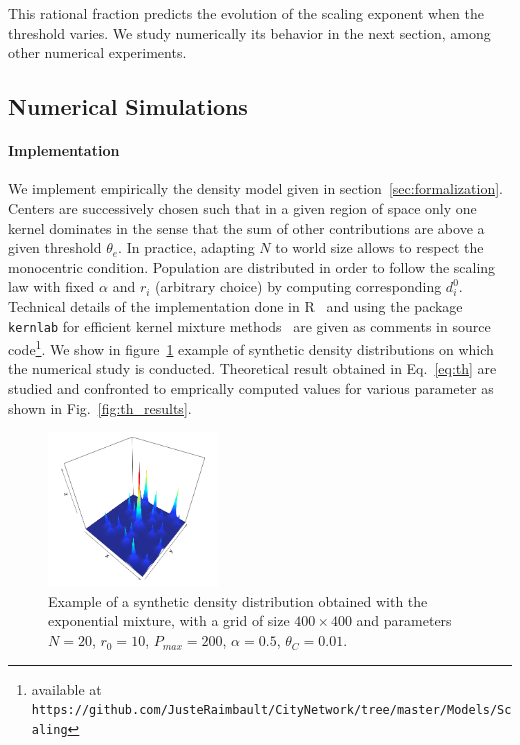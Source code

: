 This rational fraction predicts the evolution of the scaling exponent when the threshold varies. We study numerically its behavior in the next section, among other numerical experiments.


\subsection{Numerical Simulations}

\paragraph{Implementation}

We implement empirically the density model given in section~\ref{sec:formalization}. Centers are successively chosen such that in a given region of space only one kernel dominates in the sense that the sum of other contributions are above a given threshold $\theta_e$. In practice, adapting $N$ to world size allows to respect the monocentric condition. Population are distributed in order to follow the scaling law with fixed $\alpha$ and $r_i$ (arbitrary choice) by computing corresponding $d_i^0$. Technical details of the implementation done in R~\cite{R-Core-Team:2015fk} and using the package \texttt{kernlab} for efficient kernel mixture methods~\cite{Karatzoglou:2004uq} are given as comments in source code\footnote{available at \texttt{https://github.com/JusteRaimbault/CityNetwork/tree/master/Models/Scaling}}. We show in figure~\ref{fig:ex-distrib} example of synthetic density distributions on which the numerical study is conducted. Theoretical result obtained in Eq.~\ref{eq:th} are studied and confronted to emprically computed values for various parameter as shown in Fig.~\ref{fig:th_results}.

\begin{figure}
\centering
\includegraphics[width=0.4\textwidth]{Figures/PartI/Methodology/Scaling/example_exp_mixture}
\caption{Example of a synthetic density distribution obtained with the exponential mixture, with a grid of size $400\times 400$ and parameters $N=20$, $r_0=10$, $P_{max}=200$, $\alpha=0.5$, $\theta_C = 0.01$.}
\label{fig:ex-distrib}
\end{figure}



